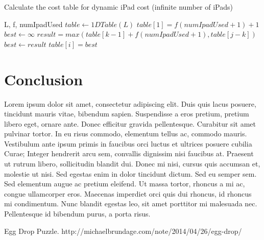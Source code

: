 \documentclass[12pt,a4paper,oneside]{report}
\begin{document}
\begin{algorithm}[H]
\caption{Calculate the cost table for dynamic iPad cost (infinite number of iPads)}
\begin{algorithmic}[1]
\REQUIRE L, f, numIpadUsed
\STATE $table \leftarrow 1DTable(L)$
\STATE $table[1] = f(numIpadUsed+1)+1$
	\STATE $best \leftarrow \infty$
		\STATE $result = max(table[k - 1] + f(numIpadUsed+1), table[j - k])$
			\STATE $best \leftarrow result$
		\ENDIF
	\ENDFOR
	\STATE $table[i] = best$
\ENDFOR
\end{algorithmic}
\end{algorithm}


\chapter{Conclusion}
Lorem ipsum dolor sit amet, consectetur adipiscing elit. Duis quis lacus posuere, tincidunt mauris vitae, bibendum sapien. Suspendisse a eros pretium, pretium libero eget, ornare ante. Donec efficitur gravida pellentesque. Curabitur sit amet pulvinar tortor. In eu risus commodo, elementum tellus ac, commodo mauris. Vestibulum ante ipsum primis in faucibus orci luctus et ultrices posuere cubilia Curae; Integer hendrerit arcu sem, convallis dignissim nisi faucibus at. Praesent ut rutrum libero, sollicitudin blandit dui. Donec mi nisi, cursus quis accumsan et, molestie ut nisi. Sed egestas enim in dolor tincidunt dictum. Sed eu semper sem. Sed elementum augue ac pretium eleifend. Ut massa tortor, rhoncus a mi ac, congue ullamcorper eros. Maecenas imperdiet orci quis dui rhoncus, id rhoncus mi condimentum. Nunc blandit egestas leo, sit amet porttitor mi malesuada nec. Pellentesque id bibendum purus, a porta risus.


\renewcommand{\bibname}{References}
\begin{thebibliography}{1} 
	 Egg Drop Puzzle. http://michaelbrundage.com/note/2014/04/26/egg-drop/
\end{thebibliography}

\end{document}
